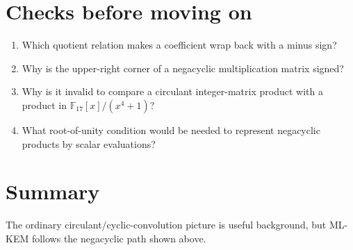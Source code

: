 \section{Checks before moving on}

\begin{enumerate}
  \item Which quotient relation makes a coefficient wrap back with a minus sign?
  \item Why is the upper-right corner of a negacyclic multiplication matrix signed?
  \item Why is it invalid to compare a circulant integer-matrix product with a product in $\mathbb{F}_{17}[x]/(x^4+1)$?
  \item What root-of-unity condition would be needed to represent negacyclic products by scalar evaluations?
\end{enumerate}

\section{Summary}

\begin{center}
\end{center}

The ordinary circulant/cyclic-convolution picture is useful background, but ML-KEM follows the negacyclic path shown above.

\printbibliography[heading=chapterrefs]
